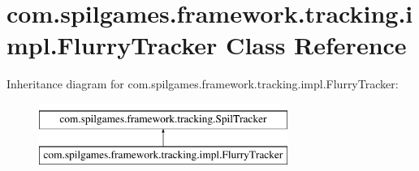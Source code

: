 \hypertarget{classcom_1_1spilgames_1_1framework_1_1tracking_1_1impl_1_1_flurry_tracker}{\section{com.\-spilgames.\-framework.\-tracking.\-impl.\-Flurry\-Tracker Class Reference}
\label{classcom_1_1spilgames_1_1framework_1_1tracking_1_1impl_1_1_flurry_tracker}
}
Inheritance diagram for com.\-spilgames.\-framework.\-tracking.\-impl.\-Flurry\-Tracker\-:\begin{figure}[H]
\begin{center}
\leavevmode
\includegraphics[height=2.000000cm]{classcom_1_1spilgames_1_1framework_1_1tracking_1_1impl_1_1_flurry_tracker}
\end{center}
\end{figure}
